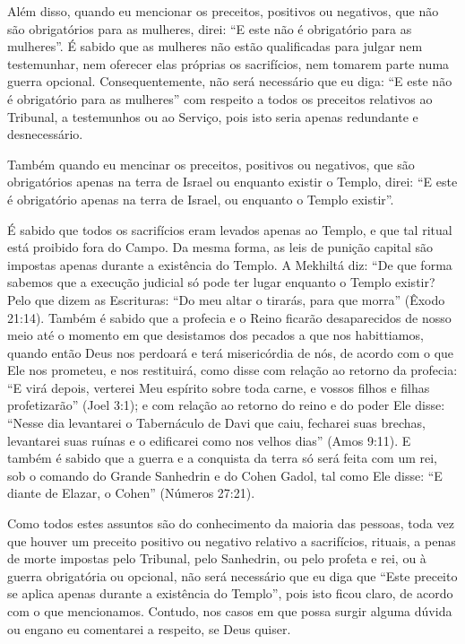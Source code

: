 Além disso, quando eu mencionar os preceitos, positivos ou negativos,
que não são obrigatórios para as mulheres, direi: ``E este não é
obrigatório para as mulheres''. É sabido que as mulheres não estão
qualificadas para julgar nem testemunhar, nem oferecer elas próprias os
sacrifícios, nem tomarem parte numa guerra opcional. Consequentemente,
não será necessário que eu diga: ``E este não é obrigatório para as
mulheres'' com respeito a todos os preceitos relativos ao Tribunal, a
testemunhos ou ao Serviço, pois isto seria apenas redundante e
desnecessário.

Também quando eu mencinar os preceitos, positivos ou negativos, que são
obrigatórios apenas na terra de Israel ou enquanto existir o Templo,
direi: ``E este é obrigatório apenas na terra de Israel, ou enquanto o
Templo existir''.

É sabido que todos os sacrifícios eram levados apenas ao Templo, e que
tal ritual está proibido fora do Campo. Da mesma forma, as leis de
punição capital são impostas apenas durante a existência do Templo. A
Mekhiltá diz: ``De que forma sabemos que a execução judicial só pode ter
lugar enquanto o Templo existir? Pelo que dizem as Escrituras: ``Do meu
altar o tirarás, para que morra'' (Êxodo 21:14). Também é sabido que a
profecia e o Reino ficarão desaparecidos de nosso meio até o momento em
que desistamos dos pecados a que nos habittiamos, quando então Deus nos
perdoará e terá misericórdia de nós, de acordo com o que Ele nos
prometeu, e nos restituirá, como disse com relação ao retorno da
profecia: ``E virá depois, verterei Meu espírito sobre toda carne, e
vossos filhos e filhas profetizarão'' (Joel 3:1); e com relação ao
retorno do reino e do poder Ele disse: ``Nesse dia levantarei o
Tabernáculo de Davi que caiu, fecharei suas brechas, levantarei suas
ruínas e o edificarei como nos velhos dias'' (Amos 9:11). E também é
sabido que a guerra e a conquista da terra só será feita com um rei, sob
o comando do Grande Sanhedrin e do Cohen Gadol, tal como Ele disse:
``E diante de Elazar, o Cohen'' (Números 27:21).


Como todos estes assuntos são do conhecimento da maioria das pessoas,
toda vez que houver um preceito positivo ou negativo relativo a
sacrifícios, rituais, a penas de morte impostas pelo Tribunal, pelo
Sanhedrin, ou pelo profeta e rei, ou à guerra obrigatória ou opcional,
não será necessário que eu diga que ``Este preceito se aplica apenas
durante a existência do Templo'', pois isto ficou claro, de acordo com o
que mencionamos. Contudo, nos casos em que possa surgir alguma dúvida ou
engano eu comentarei a respeito, se Deus quiser.

